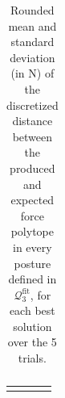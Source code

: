 \begin{table}[!ht]
\begin{tabular}{|c|c|c|c|c|c|c|c|c|c|}
    \end{tabular}
    \caption{Rounded mean and standard deviation (in N) of the discretized distance between the produced and expected force polytope in every posture defined in $\mathcal{Q}_3^{\text{fit}}$, for each best solution over the 5 trials.}
    \label{tab:accuracy_fitting_pol_p3}
\end{table}
\egroup

\bgroup
\def\arraystretch{1.2}
\begin{table}[!ht]
    \tiny
    \centering
    \begin{tabular}{|c|c|c|c|c|c|c|c|c|c|}
    \hline
     & 
     &
     & 
     \\


\end{tabular}
\end{table}
